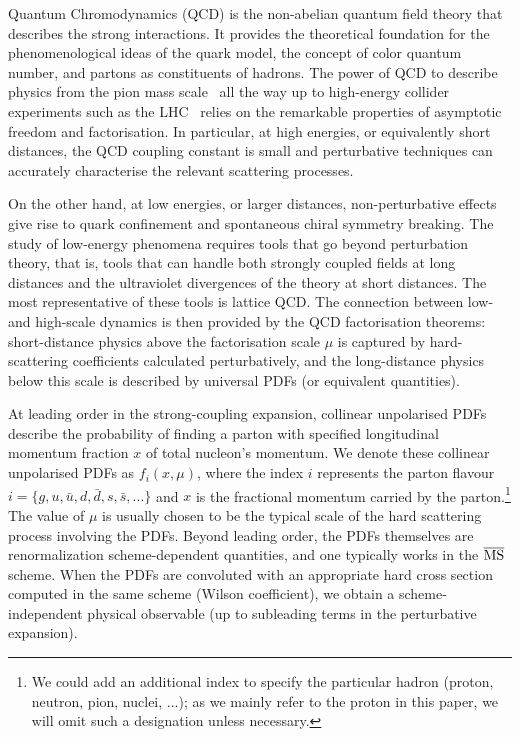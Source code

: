 Quantum Chromodynamics (QCD) is the non-abelian quantum field
theory that describes the strong interactions.
%
It provides the 
theoretical foundation 
for the phenomenological ideas of the quark model, the concept of color quantum
number, and partons as constituents of hadrons.
%
The power of QCD to describe physics from the pion mass
scale~\cite{Gasser:1983yg}
all the way up to high-energy collider
experiments such as the LHC~\cite{Campbell:2006wx}
relies on the remarkable properties of asymptotic freedom and factorisation.
%
In particular, at high energies, or equivalently
short distances, the QCD coupling constant is small and perturbative
techniques can accurately characterise the relevant scattering processes.

On the other hand,
at low energies, or larger
distances, non-perturbative effects give rise to quark confinement and
spontaneous chiral symmetry breaking.
%
The study of low-energy
phenomena requires tools that go beyond perturbation theory, that is,
tools that can handle both strongly
coupled fields at long distances and the ultraviolet divergences of
the theory at short distances.
%
The most representative of these tools is lattice QCD.
%
The connection between low- and high-scale dynamics
is then provided by the QCD factorisation theorems:
short-distance physics above the factorisation scale $\mu$ is captured by hard-scattering
coefficients calculated perturbatively, and the long-distance physics below this scale is described
by universal PDFs (or equivalent quantities).

At leading order in the strong-coupling expansion, 
collinear unpolarised PDFs describe the probability of finding a parton with
specified longitudinal momentum fraction $x$ 
of total nucleon's momentum.
%
We denote these collinear unpolarised PDFs as $f_{i}(x,\mu)$,
where the index $i$ represents the parton flavour $i=\{g,u,\bar{u},d,\bar{d},s,\bar{s},...\}$ and
$x$ is the fractional momentum carried by the parton.\footnote{We could add an additional index to specify the particular hadron
(proton, neutron, pion, nuclei, ...); as we mainly refer to the proton
  in this paper, we will omit such a designation unless necessary.}
%
The value of $\mu$ is usually chosen to be the typical scale of the hard scattering
process involving the PDFs.
%
Beyond leading order, the PDFs themselves
are renormalization scheme-dependent quantities, and one typically works in
the $\overline{\rm MS}$ scheme.
%
When the PDFs are convoluted with an appropriate
hard cross section computed in the same scheme
(Wilson coefficient), we obtain a scheme-independent
physical observable (up to subleading terms in the perturbative expansion). 

